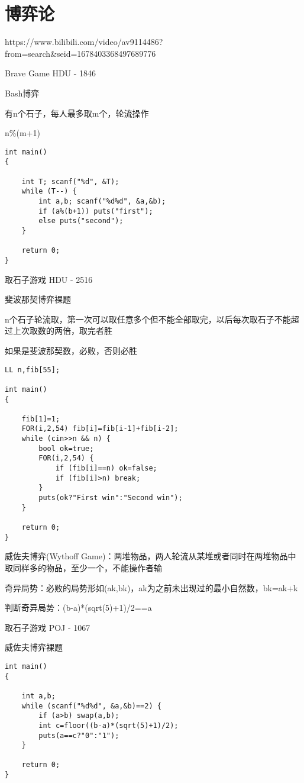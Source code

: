\section{博弈论}

https://www.bilibili.com/video/av9114486?from=search\&seid=1678403368497689776

Brave Game HDU - 1846

Bash博弈

有n个石子，每人最多取m个，轮流操作

n\%(m+1)

\begin{lstlisting}
int main()
{

    int T; scanf("%d", &T);
    while (T--) {
        int a,b; scanf("%d%d", &a,&b);
        if (a%(b+1)) puts("first");
        else puts("second");
    }

    return 0;
}
\end{lstlisting}

取石子游戏 HDU - 2516

斐波那契博弈裸题

n个石子轮流取，第一次可以取任意多个但不能全部取完，以后每次取石子不能超过上次取数的两倍，取完者胜

如果是斐波那契数，必败，否则必胜

\begin{lstlisting}
LL n,fib[55];

int main()
{

    fib[1]=1;
    FOR(i,2,54) fib[i]=fib[i-1]+fib[i-2];
    while (cin>>n && n) {
        bool ok=true;
        FOR(i,2,54) {
            if (fib[i]==n) ok=false;
            if (fib[i]>n) break;
        }
        puts(ok?"First win":"Second win");
    }

    return 0;
}
\end{lstlisting}

威佐夫博弈(Wythoff Game)：两堆物品，两人轮流从某堆或者同时在两堆物品中取同样多的物品，至少一个，不能操作者输

奇异局势：必败的局势形如(ak,bk)，ak为之前未出现过的最小自然数，bk=ak+k

判断奇异局势：(b-a)*(sqrt(5)+1)/2==a

取石子游戏 POJ - 1067

威佐夫博弈裸题

\begin{lstlisting}
int main()
{

    int a,b;
    while (scanf("%d%d", &a,&b)==2) {
        if (a>b) swap(a,b);
        int c=floor((b-a)*(sqrt(5)+1)/2);
        puts(a==c?"0":"1");
    }

    return 0;
}
\end{lstlisting}

